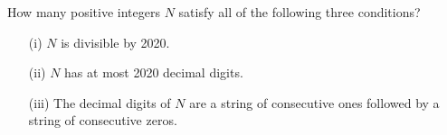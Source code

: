 How many positive integers $N$ satisfy all of the following three conditions?
\begin{enumerate}
\item[(i)] $N$ is divisible by 2020.
\item[(ii)] $N$ has at most 2020 decimal digits.
\item[(iii)] The decimal digits of $N$ are a string of consecutive ones followed by a string of consecutive zeros.
\end{enumerate}
